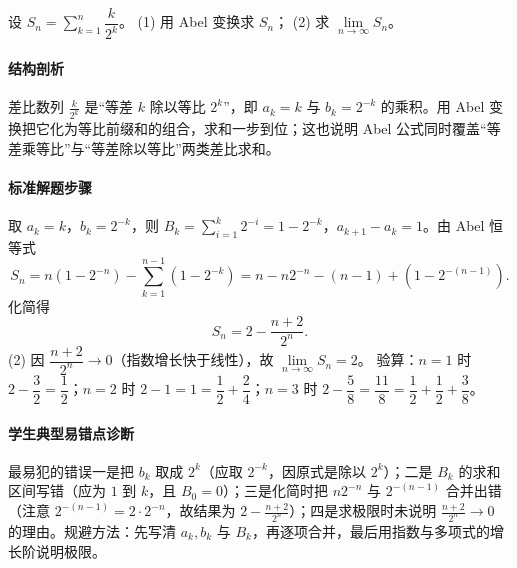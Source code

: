 \begin{problem}
设 $S_n=\sum\limits_{k=1}^n\dfrac{k}{2^k}$。
(1) 用 Abel 变换求 $S_n$；
(2) 求 $\lim\limits_{n\to\infty}S_n$。
\end{problem}
\begin{solution}
\paragraph{结构剖析}
差比数列 $\frac{k}{2^k}$ 是“等差 $k$ 除以等比 $2^k$”，即 $a_k=k$ 与 $b_k=2^{-k}$ 的乘积。用 Abel 变换把它化为等比前缀和的组合，求和一步到位；这也说明 Abel 公式同时覆盖“等差乘等比”与“等差除以等比”两类差比求和。
\paragraph{标准解题步骤}
取 $a_k=k$，$b_k=2^{-k}$，则 $B_k=\sum_{i=1}^k2^{-i}=1-2^{-k}$，$a_{k+1}-a_k=1$。由 Abel 恒等式
$$S_n=n(1-2^{-n})-\sum_{k=1}^{n-1}(1-2^{-k})
=n-n2^{-n}-(n-1)+(1-2^{-(n-1)}).$$
化简得
$$S_n=2-\frac{n+2}{2^n}.$$
(2) 因 $\dfrac{n+2}{2^n}\to0$（指数增长快于线性），故 $\lim\limits_{n\to\infty}S_n=2$。
验算：$n=1$ 时 $2-\dfrac32=\dfrac12$；$n=2$ 时 $2-1=1=\dfrac12+\dfrac24$；$n=3$ 时 $2-\dfrac58=\dfrac{11}8=\dfrac12+\dfrac12+\dfrac38$。
\paragraph{学生典型易错点诊断}
最易犯的错误一是把 $b_k$ 取成 $2^k$（应取 $2^{-k}$，因原式是除以 $2^k$）；二是 $B_k$ 的求和区间写错（应为 $1$ 到 $k$，且 $B_0=0$）；三是化简时把 $n2^{-n}$ 与 $2^{-(n-1)}$ 合并出错（注意 $2^{-(n-1)}=2\cdot2^{-n}$，故结果为 $2-\frac{n+2}{2^n}$）；四是求极限时未说明 $\frac{n+2}{2^n}\to0$ 的理由。规避方法：先写清 $a_k,b_k$ 与 $B_k$，再逐项合并，最后用指数与多项式的增长阶说明极限。
\end{solution}

